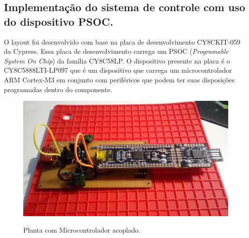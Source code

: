 \documentclass[
	article,			%
	11pt,				%
	oneside,			%
	a4paper,			%
	english,			%
	brazil,				%
	sumario=tradicional
	]{abntex2}
\begin{document}
\pagebreak

\subsection{Implementação do sistema de controle com uso do dispositivo PSOC.}
\label{sec:implement_psoc}
O layout foi desenvolvido com base na placa de desenvolvimento CY8CKIT-059 da Cypress. 
Essa placa de desenvolvimento carrega um PSOC (\textit{Programable System On Chip}) da família CY8C58LP.
O dispositivo presente na placa é o CY8C5888LTI-LP097 que é um dispositivo que carrega um microcontrolador ARM Cortex-M3 em conjunto com periféricos que podem ter suas disposições programadas dentro do componente.

\begin{figure}[htb!]
	\centering
	\caption{Planta com Microcontrolador acoplado.}
	\includegraphics[scale=0.14]{./img/plantaMontagem_1.jpg}
	\label{fig:plantaMontagem_1}
\end{figure}
\end{document}
